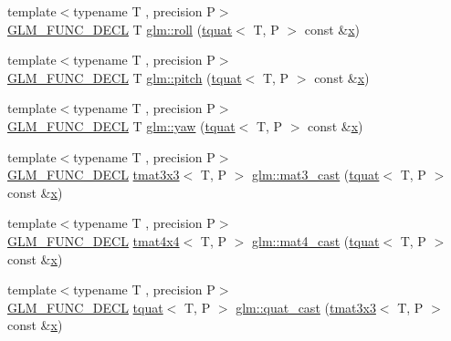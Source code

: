 \begin{DoxyCompactItemize}
\item 
{\footnotesize template$<$typename T , precision P$>$ }\\\mbox{\hyperlink{setup_8hpp_ab2d052de21a70539923e9bcbf6e83a51}{G\+L\+M\+\_\+\+F\+U\+N\+C\+\_\+\+D\+E\+CL}} T \mbox{\hyperlink{group__gtc__quaternion_ga4fd705376c6c1fd667be0055a0ea58ec}{glm\+::roll}} (\mbox{\hyperlink{structglm_1_1tquat}{tquat}}$<$ T, P $>$ const \&\mbox{\hyperlink{glad_8h_a92d0386e5c19fb81ea88c9f99644ab1d}{x}})
\item 
{\footnotesize template$<$typename T , precision P$>$ }\\\mbox{\hyperlink{setup_8hpp_ab2d052de21a70539923e9bcbf6e83a51}{G\+L\+M\+\_\+\+F\+U\+N\+C\+\_\+\+D\+E\+CL}} T \mbox{\hyperlink{group__gtc__quaternion_ga2c08b93a4261c10748fd4d2104346f17}{glm\+::pitch}} (\mbox{\hyperlink{structglm_1_1tquat}{tquat}}$<$ T, P $>$ const \&\mbox{\hyperlink{glad_8h_a92d0386e5c19fb81ea88c9f99644ab1d}{x}})
\item 
{\footnotesize template$<$typename T , precision P$>$ }\\\mbox{\hyperlink{setup_8hpp_ab2d052de21a70539923e9bcbf6e83a51}{G\+L\+M\+\_\+\+F\+U\+N\+C\+\_\+\+D\+E\+CL}} T \mbox{\hyperlink{group__gtc__quaternion_ga724a5df282b70cec0a6cb0d6dcddb6d6}{glm\+::yaw}} (\mbox{\hyperlink{structglm_1_1tquat}{tquat}}$<$ T, P $>$ const \&\mbox{\hyperlink{glad_8h_a92d0386e5c19fb81ea88c9f99644ab1d}{x}})
\item 
{\footnotesize template$<$typename T , precision P$>$ }\\\mbox{\hyperlink{setup_8hpp_ab2d052de21a70539923e9bcbf6e83a51}{G\+L\+M\+\_\+\+F\+U\+N\+C\+\_\+\+D\+E\+CL}} \mbox{\hyperlink{structglm_1_1tmat3x3}{tmat3x3}}$<$ T, P $>$ \mbox{\hyperlink{group__gtc__quaternion_gae04c39422eb4e450ec8c4f45a1057b40}{glm\+::mat3\+\_\+cast}} (\mbox{\hyperlink{structglm_1_1tquat}{tquat}}$<$ T, P $>$ const \&\mbox{\hyperlink{glad_8h_a92d0386e5c19fb81ea88c9f99644ab1d}{x}})
\item 
{\footnotesize template$<$typename T , precision P$>$ }\\\mbox{\hyperlink{setup_8hpp_ab2d052de21a70539923e9bcbf6e83a51}{G\+L\+M\+\_\+\+F\+U\+N\+C\+\_\+\+D\+E\+CL}} \mbox{\hyperlink{structglm_1_1tmat4x4}{tmat4x4}}$<$ T, P $>$ \mbox{\hyperlink{group__gtc__quaternion_ga14bb2ddf028c91542763eb6f2bba47ef}{glm\+::mat4\+\_\+cast}} (\mbox{\hyperlink{structglm_1_1tquat}{tquat}}$<$ T, P $>$ const \&\mbox{\hyperlink{glad_8h_a92d0386e5c19fb81ea88c9f99644ab1d}{x}})
\item 
{\footnotesize template$<$typename T , precision P$>$ }\\\mbox{\hyperlink{setup_8hpp_ab2d052de21a70539923e9bcbf6e83a51}{G\+L\+M\+\_\+\+F\+U\+N\+C\+\_\+\+D\+E\+CL}} \mbox{\hyperlink{structglm_1_1tquat}{tquat}}$<$ T, P $>$ \mbox{\hyperlink{group__gtc__quaternion_ga950f8acff3e33bbda77895a3dcb7e5ce}{glm\+::quat\+\_\+cast}} (\mbox{\hyperlink{structglm_1_1tmat3x3}{tmat3x3}}$<$ T, P $>$ const \&\mbox{\hyperlink{glad_8h_a92d0386e5c19fb81ea88c9f99644ab1d}{x}})

\end{DoxyCompactItemize}
